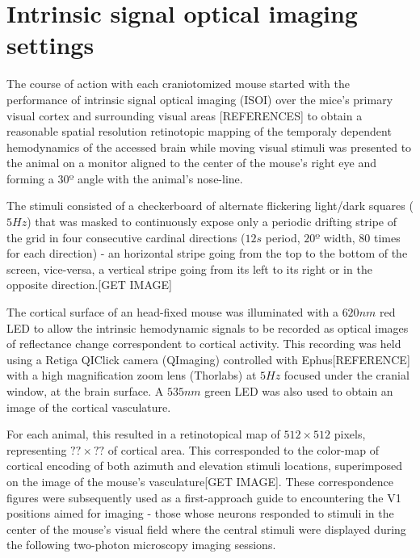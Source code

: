 \section{Intrinsic signal optical imaging settings}
\label{sec:Intrinsic-signal-optical-imaging-settings}

The course of action with each craniotomized mouse started with the performance of intrinsic signal optical imaging (ISOI) over the mice's primary visual cortex and surrounding visual areas [REFERENCES] to obtain a reasonable spatial resolution retinotopic mapping of the temporaly dependent hemodynamics of the accessed brain while moving visual stimuli was presented to the animal on a monitor aligned to the center of the mouse's right eye and forming a $30º$ angle with the animal's nose-line.

The stimuli consisted of a checkerboard of alternate flickering light/dark squares ($5 Hz$) that was masked to continuously expose only a periodic drifting stripe of the grid in four consecutive cardinal directions ($12 s$ period, $20º$ width, 80 times for each direction) - an horizontal stripe going from the top to the bottom of the screen, vice-versa, a vertical stripe going from its left to its right or in the opposite direction.[GET IMAGE]

The cortical surface of an head-fixed mouse was illuminated with a $620 nm$ red LED to allow the intrinsic hemodynamic signals to be recorded as optical images of reflectance change correspondent to cortical activity. This recording was held using a Retiga QIClick camera (QImaging) controlled with Ephus[REFERENCE] with a high magnification zoom lens (Thorlabs) at $5 Hz$ focused under the cranial window, at the brain surface. A $535 nm$ green LED was also used to obtain an image of the cortical vasculature.

For each animal, this resulted in a retinotopical map of $512 \times 512$ pixels, representing $?? \times ??$ of cortical area. This corresponded to the color-map of cortical encoding of both azimuth and elevation stimuli locations, superimposed on the image of the mouse's vasculature[GET IMAGE]. These correspondence figures were subsequently used as a first-approach guide to encountering the V1 positions aimed for imaging - those whose neurons responded to stimuli in the center of the mouse's visual field where the central stimuli were displayed during the following two-photon microscopy imaging sessions.

